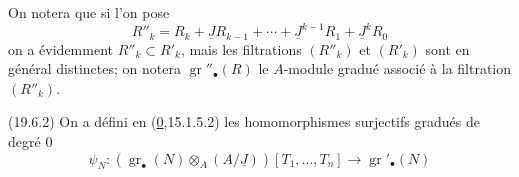 {On notera que si l'on pose
\[
R''_k=R_k+\underline JR_{k-1}+\cdots+\underline J^{k-1}R_1+\underline J^kR_0
\]
on a évidemment $R''_k\subset R'_k$, mais les filtrations $(R''_k)$ et $(R'_k)$ sont en général distinctes; on notera $\operatorname{gr}''_\bullet(R)$ le $A$-module gradué associé à la filtration $(R''_k)$.

(19.6.2) On a défini en (\uline{0},15.1.5.2) les homomorphismes surjectifs gradués de degré $0$
\[
\psi_N:(\operatorname{gr}_\bullet(N)\otimes_A(A/\underline J))[T_1,\ldots,T_n]\longrightarrow\operatorname{gr}'_\bullet(N)
\]
}
